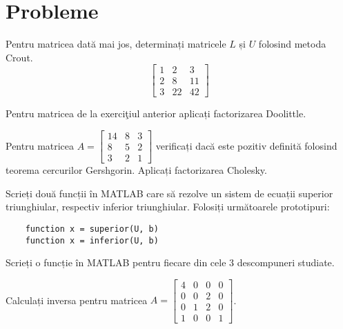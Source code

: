 \documentclass{exam}
\begin{document}
\section{Probleme}

\begin{questions}
	\boxedpoints
	\pointsinmargin

	\question Pentru matricea dată mai jos, determinați matricele $L$ și $U$
	folosind metoda Crout.
	\begin{equation*}
		\begin{bmatrix}
			1 & 2  & 3  \\
			2 & 8  & 11 \\
			3 & 22 & 42
		\end{bmatrix}
	\end{equation*}

	\question Pentru matricea de la exerciţiul anterior aplicați factorizarea
	Doolittle.

	\question Pentru matricea $A = \begin{bmatrix} 14 & 8 & 3 \\ 8 & 5 & 2 \\ 3 & 2 & 1 \end{bmatrix}$
	verificați dacă este pozitiv definită folosind teorema cercurilor Gershgorin.
	Aplicați factorizarea Cholesky.

	\question Scrieți două funcții în MATLAB care să rezolve un sistem de
	ecuații superior triunghiular, respectiv inferior triunghiular. Folosiți
	următoarele prototipuri:
	\begin{verbatim}
	function x = superior(U, b)
	function x = inferior(U, b)
	\end{verbatim}

	\question Scrieți o funcție în MATLAB pentru fiecare din cele 3 descompuneri
	studiate.

	\question Calculați inversa pentru matricea $A = \begin{bmatrix} 4 & 0 & 0 & 0 \\ 0 & 0 & 2 & 0 \\ 0 & 1 & 2 & 0 \\ 1 & 0 & 0 & 1 \end{bmatrix}$.

\end{questions}



\end{document}
